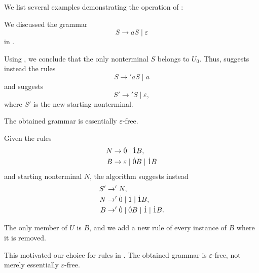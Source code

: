 \begin{example}\label{ex:alg:epsilon_rule_removal}
  We list several examples demonstrating the operation of :
  \begin{thmenum}
     We discussed the grammar
    \begin{equation*}
      S \to aS \mid \varepsilon
    \end{equation*}
    in .

    Using , we conclude that the only nonterminal \( S \) belongs to \( U_0 \). Thus,  suggests instead the rules
    \begin{equation*}
      S \to' aS \mid a
    \end{equation*}
    and  suggests
    \begin{equation*}
      S' \to' S \mid \varepsilon,
    \end{equation*}
    where \( S' \) is the new starting nonterminal.

    The obtained grammar is essentially \( \varepsilon \)-free.

     Given the rules
    \begin{equation*}
      \begin{aligned}
        N &\to \dot{0} \mid \dot{1} B, \\
        B &\to \varepsilon \mid \dot{0} B \mid \dot{1} B
      \end{aligned}
    \end{equation*}
    and starting nonterminal \( N \), the algorithm suggests instead
    \begin{equation*}
      \begin{aligned}
        S' &\to' N, \\
        N  &\to' \dot{0} \mid \dot{1} \mid \dot{1} B, \\
        B  &\to' \dot{0} \mid \dot{0} B \mid \dot{1} \mid \dot{1} B.
      \end{aligned}
    \end{equation*}

    The only member of \( U \) is \( B \), and we add a new rule of every instance of \( B \) where it is removed.

    This motivated our choice for rules in . The obtained grammar is \( \varepsilon \)-free, not merely essentially \( \varepsilon \)-free.


\end{thmenum}
\end{example}

